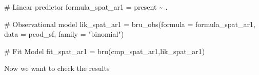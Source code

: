 \documentclass[
  letterpaper,
  DIV=11,
  numbers=noendperiod]{scrartcl}
\newenvironment{Shaded}{\begin{snugshade}}{\end{snugshade}}
\newcommand{\AttributeTok}[1]{\textcolor[rgb]{0.40,0.45,0.13}{#1}}
\newcommand{\CommentTok}[1]{\textcolor[rgb]{0.37,0.37,0.37}{#1}}
\newcommand{\FunctionTok}[1]{\textcolor[rgb]{0.28,0.35,0.67}{#1}}
\newcommand{\NormalTok}[1]{\textcolor[rgb]{0.00,0.23,0.31}{#1}}
\newcommand{\OtherTok}[1]{\textcolor[rgb]{0.00,0.23,0.31}{#1}}
\newcommand{\SpecialCharTok}[1]{\textcolor[rgb]{0.37,0.37,0.37}{#1}}
\newcommand{\StringTok}[1]{\textcolor[rgb]{0.13,0.47,0.30}{#1}}
\begin{document}
\begin{tcolorbox}
\begin{Shaded}
\begin{Highlighting}[]
\CommentTok{\# Linear predictor}
\NormalTok{formula\_spat\_ar1 }\OtherTok{=}\NormalTok{ present }\SpecialCharTok{\textasciitilde{}}\NormalTok{ .}

\CommentTok{\# Observational model}
\NormalTok{lik\_spat\_ar1 }\OtherTok{=} \FunctionTok{bru\_obs}\NormalTok{(}\AttributeTok{formula =}\NormalTok{ formula\_spat\_ar1, }
              \AttributeTok{data =}\NormalTok{ pcod\_sf, }
              \AttributeTok{family =} \StringTok{"binomial"}\NormalTok{)}

\CommentTok{\# Fit Model }
\NormalTok{fit\_spat\_ar1 }\OtherTok{=} \FunctionTok{bru}\NormalTok{(cmp\_spat\_ar1,lik\_spat\_ar1)}
\end{Highlighting}
\end{Shaded}

\end{tcolorbox}

Now we want to check the results
\end{document}
